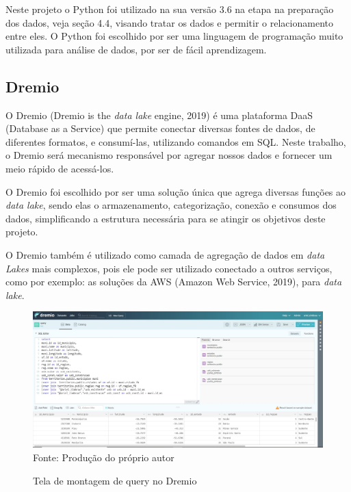 \documentclass[
	12pt,				%
	openright,			%
	oneside,			%
	a4paper,			%
	chapter=TITLE,		%
	section=TITLE,		%
	subsection=TITLE,	%
	subsubsection=TITLE,%
	english,			%
	brazil				%
	]{abntex2}
\theoremstyle{definition}
\begin{document}
    Neste projeto o Python foi utilizado na sua versão 3.6  na etapa na preparação dos dados, veja seção 4.4, visando tratar os dados e permitir o relacionamento entre eles. O Python foi escolhido por ser uma linguagem de programação muito utilizada para análise de dados, por ser de fácil aprendizagem.
    
        
\subsection{Dremio}

    O Dremio (Dremio is the \textit{data lake} engine, 2019) é uma plataforma DaaS (Database as a Service) que permite conectar diversas fontes de dados, de diferentes formatos, e consumí-las, utilizando comandos em SQL. Neste trabalho, o Dremio será mecanismo responsável por agregar nossos dados e fornecer um meio rápido de acessá-los.

    O Dremio foi escolhido por ser uma solução única que agrega diversas funções ao \textit{data lake}, sendo elas o armazenamento, categorização, conexão e consumos dos dados, simplificando a estrutura necessária para se atingir os objetivos deste projeto. 
    
    O Dremio também é utilizado como camada de agregação de dados em  \textit{data Lakes} mais complexos, pois ele pode ser utilizado conectado a outros serviços, como por exemplo: as soluções da AWS (Amazon Web Service, 2019), para \textit{data lake}.
    
    \begin{figure}[H]
         \centering
         \caption{Tela de montagem de query no Dremio}
         \includegraphics[scale=0.4]{imagens/dremio.JPG}
         \\{\footnotesize Fonte: Produção do próprio autor}
         \label{screenshot dremio}
    \end{figure}
    
\end{document}
